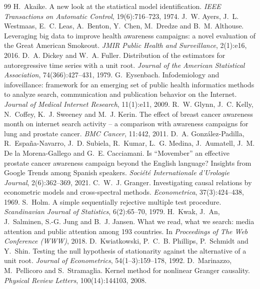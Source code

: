 \documentclass[11pt,a4paper]{article}
\begin{document}
\begin{thebibliography}{99}
 H.~Akaike. A new look at the statistical model identification. \emph{IEEE Transactions on Automatic Control}, 19(6):716--723, 1974.
 J.~W. Ayers, J.~L. Westmaas, E.~C. Leas, A.~Benton, Y.~Chen, M.~Dredze and B.~M. Althouse. Leveraging big data to improve health awareness campaigns: a novel evaluation of the Great American Smokeout. \emph{JMIR Public Health and Surveillance}, 2(1):e16, 2016.
 D.~A. Dickey and W.~A. Fuller. Distribution of the estimators for autoregressive time series with a unit root. \emph{Journal of the American Statistical Association}, 74(366):427--431, 1979.
 G.~Eysenbach. Infodemiology and infoveillance: framework for an emerging set of public health informatics methods to analyze search, communication and publication behavior on the Internet. \emph{Journal of Medical Internet Research}, 11(1):e11, 2009.
 R.~W. Glynn, J.~C. Kelly, N.~Coffey, K.~J. Sweeney and M.~J. Kerin. The effect of breast cancer awareness month on internet search activity -- a comparison with awareness campaigns for lung and prostate cancer. \emph{BMC Cancer}, 11:442, 2011.
 D.~A. Gonz\'alez-Padilla, R.~Espa\~na-Navarro, J.~D. Subiela, R.~Kumar, L.~G. Medina, J.~Aumatell, J.~M. De la Morena-Gallego and G.~E. Cacciamani. Is ``Movember'' an effective prostate cancer awareness campaign beyond the English language? Insights from Google Trends among Spanish speakers. \emph{Soci\'et\'e Internationale d'Urologie Journal}, 2(6):362--369, 2021.
 C.~W.~J. Granger. Investigating causal relations by econometric models and cross-spectral methods. \emph{Econometrica}, 37(3):424--438, 1969.
 S.~Holm. A simple sequentially rejective multiple test procedure. \emph{Scandinavian Journal of Statistics}, 6(2):65--70, 1979.
 H.~Kwak, J.~An, J.~Salminen, S.-G. Jung and B.~J. Jansen. What we read, what we search: media attention and public attention among 193 countries. In \emph{Proceedings of The Web Conference (WWW)}, 2018.
 D.~Kwiatkowski, P.~C.~B. Phillips, P.~Schmidt and Y.~Shin. Testing the null hypothesis of stationarity against the alternative of a unit root. \emph{Journal of Econometrics}, 54(1--3):159--178, 1992.
 D.~Marinazzo, M.~Pellicoro and S.~Stramaglia. Kernel method for nonlinear Granger causality. \emph{Physical Review Letters}, 100(14):144103, 2008.

\end{thebibliography}
\end{document}
